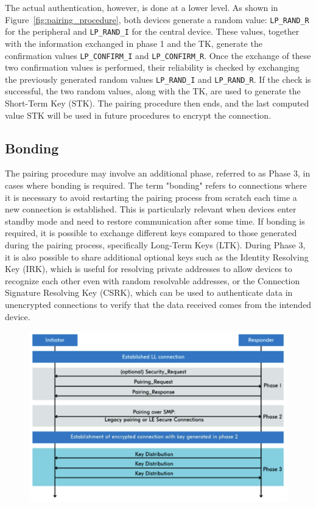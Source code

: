 \documentclass{Configuration_Files/PoliMi3i_thesis}
\begin{document}
The actual authentication, however, is done at a lower level. As shown in Figure~\ref{fig:pairing_procedure}, both devices generate a random value: \texttt{LP\_RAND\_R} for the peripheral and \texttt{LP\_RAND\_I} for the central device. These values, together with the information exchanged in phase 1 and the TK, generate the confirmation values \texttt{LP\_CONFIRM\_I} and \texttt{LP\_CONFIRM\_R}. Once the exchange of these two confirmation values is performed, their reliability is checked by exchanging the previously generated random values \texttt{LP\_RAND\_I} and \texttt{LP\_RAND\_R}. If the check is successful, the two random values, along with the TK, are used to generate the Short-Term Key (STK). The pairing procedure then ends, and the last computed value STK will be used in future procedures to encrypt the connection.

\subsection{Bonding}

The pairing procedure may involve an additional phase, referred to as Phase 3, in cases where bonding is required. The term "bonding" refers to connections where it is necessary to avoid restarting the pairing process from scratch each time a new connection is established. This is particularly relevant when devices enter standby mode and need to restore communication after some time. If bonding is required, it is possible to exchange different keys compared to those generated during the pairing process, specifically Long-Term Keys (LTK). During Phase 3, it is also possible to share additional optional keys such as the Identity Resolving Key (IRK), which is useful for resolving private addresses to allow devices to recognize each other even with random resolvable addresses, or the Connection Signature Resolving Key (CSRK), which can be used to authenticate data in unencrypted connections to verify that the data received comes from the intended device. 

\begin{figure}[h]
\centering
\includegraphics[scale=0.7]{Bluetooth_Security/4.png}
\label{fig:pairing_summary}
\end{figure}
\end{document}
